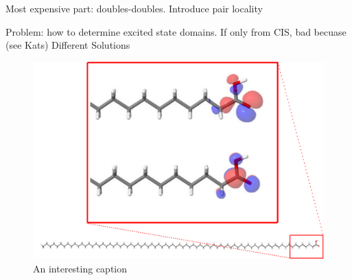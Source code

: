 Most expensive part: doubles-doubles. Introduce pair locality

Problem: how to determine excited state domains. If only from CIS, bad becuase (see Kats) Different Solutions

\begin{figure}
\centering
\includegraphics[scale=0.6]{Pics/NTOACID}
\caption{An interesting caption}
\end{figure}


